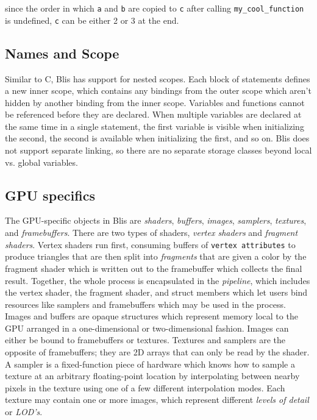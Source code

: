 \documentclass[11pt]{article}
\newcommand{\code}[1]{\texttt{#1}}
\begin{document}
since the order in which \code{a} and \code{b} are copied to \code{c} after calling \code{my\_cool\_function} is undefined, \code{c} can be either 2 or 3 at the end.

\subsection{Names and Scope}

Similar to C, Blis has support for nested scopes. Each block of statements defines a new inner scope, which contains any bindings from the outer scope which aren't hidden by another binding from the inner scope. Variables and functions cannot be referenced before they are declared. When multiple variables are declared at the same time in a single statement, the first variable is visible when initializing the second, the second is available when initializing the first, and so on. Blis does not support separate linking, so there are no separate storage classes beyond local vs. global variables.

\subsection{GPU specifics}

The GPU-specific objects in Blis are \textit{shaders}, \textit{buffers}, \textit{images}, \textit{samplers}, \textit{textures}, and \textit{framebuffers}. There are two types of shaders, \textit{vertex shaders} and \textit{fragment shaders}. Vertex shaders run first, consuming buffers of \code{vertex attributes} to produce triangles that are then split into \textit{fragments} that are given a color by the fragment shader which is written out to the framebuffer which collects the final result. Together, the whole process is encapsulated in the \textit{pipeline}, which includes the vertex shader, the fragment shader, and struct members which let users bind resources like samplers and framebuffers which may be used in the process. Images and buffers are opaque structures which represent memory local to the GPU arranged in a one-dimensional or two-dimensional fashion. Images can either be bound to framebuffers or textures. Textures and samplers are the opposite of framebuffers; they are 2D arrays that can only be read by the shader. A sampler is a fixed-function piece of hardware which knows how to sample a texture at an arbitrary floating-point location by interpolating between nearby pixels in the texture using one of a few different interpolation modes. Each texture may contain one or more images, which represent different \textit{levels of detail} or \textit{LOD's}.
\end{document}

